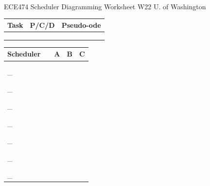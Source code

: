 \documentclass{article}
\begin{document}
ECE474 Scheduler Diagramming Worksheet    \hspace{.75in}      W22      \hspace{.8in}               U. of Washington\\


\renewcommand\arraystretch{1.7}%

\begin{tabular}{|p{1in}|p{1in}|p{3.5in}|}
\hline
Task    & P/C/D  & Pseudo-ode \\ \hline
        &  &    \\[.55in] \hline
        &  &     \\[.55in] \hline
        &  &    \\[.55in] \hline    
\end{tabular}

\begin{tabular}{|p{1in}|p{0.3in}|p{1in}|p{1in}|p{1in}|}
\hline
Scheduler &  & A & B & C \\ \hline
        &  &   &   &   \\ \hline
        &  &   &   &   \\ \hline
   \_     &  &   &   &   \\ \hline
        &  &   &   &   \\ \hline
        &  &   &   &   \\ \hline
   \_     &  &   &   &   \\ \hline
        &  &   &   &   \\ \hline
        &  &   &   &   \\ \hline
    \_    &  &   &   &   \\ \hline
        &  &   &   &   \\ \hline
        &  &   &   &   \\ \hline
    \_    &  &   &   &   \\ \hline 
        &  &   &   &   \\ \hline
        &  &   &   &   \\ \hline
   \_     &  &   &   &   \\ \hline
        &  &   &   &   \\ \hline
        &  &   &   &   \\ \hline
   \_     &  &   &   &   \\ \hline
        &  &   &   &   \\ \hline
        &  &   &   &   \\ \hline
    \_    &  &   &   &   \\ \hline
\end{tabular}
\newpage
\end{document}
